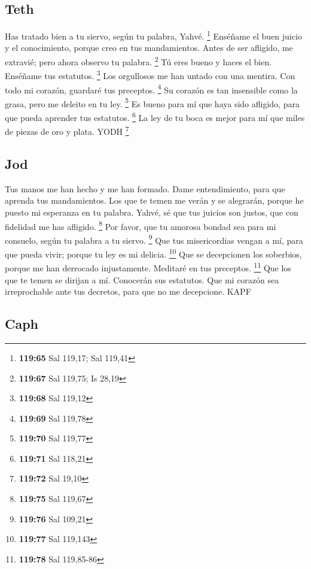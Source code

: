 \begin{paracol}{2}
\hypertarget{teth}{%
\subsection{Teth}\label{teth}}

 Has tratado bien a tu siervo, según tu palabra, Yahvé.
\footnote{\textbf{119:65} Sal 119,17; Sal 119,41} 
Enséñame el buen juicio y el conocimiento, porque creo en tus
mandamientos.  Antes de ser afligido, me extravié; pero
ahora observo tu palabra. \footnote{\textbf{119:67} Sal 119,75; Is 28,19}
 Tú eres bueno y haces el bien. Enséñame tus estatutos.
\footnote{\textbf{119:68} Sal 119,12}  Los orgullosos me
han untado con una mentira. Con todo mi corazón, guardaré tus preceptos.
\footnote{\textbf{119:69} Sal 119,78}  Su corazón es tan
insensible como la grasa, pero me deleito en tu ley. \footnote{\textbf{119:70}
  Sal 119,77}  Es bueno para mí que haya sido afligido,
para que pueda aprender tus estatutos. \footnote{\textbf{119:71} Sal
  118,21}  La ley de tu boca es mejor para mí que miles
de piezas de oro y plata. YODH \footnote{\textbf{119:72} Sal 19,10}

\hypertarget{jod}{%
\subsection{Jod}\label{jod}}

 Tus manos me han hecho y me han formado. Dame
entendimiento, para que aprenda tus mandamientos.  Los
que te temen me verán y se alegrarán, porque he puesto mi esperanza en
tu palabra.  Yahvé, sé que tus juicios son justos, que
con fidelidad me has afligido. \footnote{\textbf{119:75} Sal 119,67}
 Por favor, que tu amorosa bondad sea para mi consuelo,
según tu palabra a tu siervo. \footnote{\textbf{119:76} Sal 109,21}
 Que tus misericordias vengan a mí, para que pueda vivir;
porque tu ley es mi delicia. \footnote{\textbf{119:77} Sal 119,143}
 Que se decepcionen los soberbios, porque me han
derrocado injustamente. Meditaré en tus preceptos. \footnote{\textbf{119:78}
  Sal 119,85-86}  Que los que te temen se dirijan a mí.
Conocerán sus estatutos.  Que mi corazón sea
irreprochable ante tus decretos, para que no me decepcione. KAPF

\hypertarget{caph}{%
\subsection{Caph}\label{caph}}


\end{paracol}
